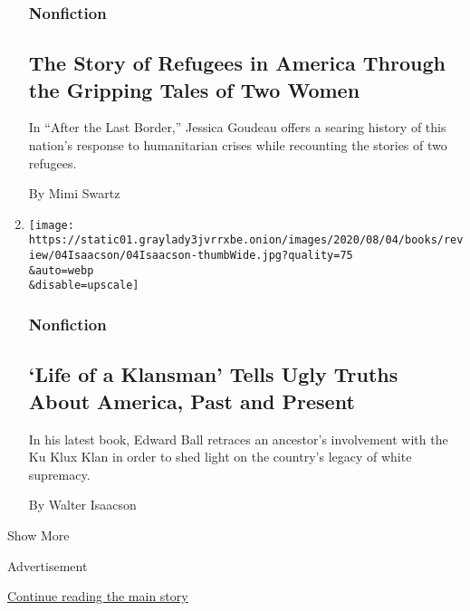 \begin{enumerate}
  \hypertarget{nonfiction-4}{%
  \subsubsection{Nonfiction}\label{nonfiction-4}}

  \hypertarget{the-story-of-refugees-in-america-through-the-gripping-tales-of-two-women}{%
  \subsection{The Story of Refugees in America Through the Gripping
  Tales of Two
  Women}\label{the-story-of-refugees-in-america-through-the-gripping-tales-of-two-women}}

  In ``After the Last Border,'' Jessica Goudeau offers a searing history
  of this nation's response to humanitarian crises while recounting the
  stories of two refugees.

  By Mimi Swartz
\item
  \href{/2020/08/04/books/review/life-of-a-klansman-edward-ball.html}{}

  \texttt{[image: https://static01.graylady3jvrrxbe.onion/images/2020/08/04/books/review/04Isaacson/04Isaacson-thumbWide.jpg?quality=75\\\&auto=webp\\\&disable=upscale]}

  \hypertarget{nonfiction-5}{%
  \subsubsection{Nonfiction}\label{nonfiction-5}}

  \hypertarget{life-of-a-klansman-tells-ugly-truths-about-america-past-and-present}{%
  \subsection{`Life of a Klansman' Tells Ugly Truths About America, Past
  and
  Present}\label{life-of-a-klansman-tells-ugly-truths-about-america-past-and-present}}

  In his latest book, Edward Ball retraces an ancestor's involvement
  with the Ku Klux Klan in order to shed light on the country's legacy
  of white supremacy.

  By Walter Isaacson
\end{enumerate}

Show More

Advertisement

\protect\hyperlink{after-mid2}{Continue reading the main story}

